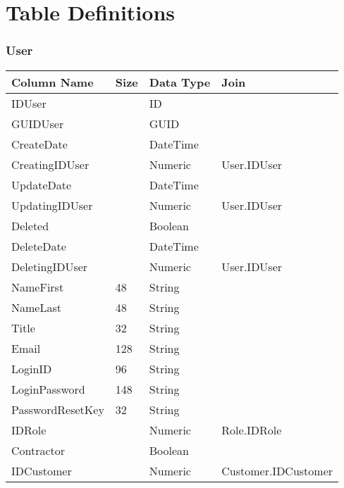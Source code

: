 \part{Table Definitions}

\section{User}
\begin{small}
\begin{tabular}{ p{5cm} p{1cm} p{3cm}  p{3.75cm} }
\textbf{Column Name} & \textbf{Size} & \textbf{Data Type} & \textbf{Join} \\ \hline 
IDUser &  & ID &  \\ 
GUIDUser &  & GUID &  \\ 
CreateDate &  & DateTime &  \\ 
CreatingIDUser &  & Numeric & User.IDUser \\ 
UpdateDate &  & DateTime &  \\ 
UpdatingIDUser &  & Numeric & User.IDUser \\ 
Deleted &  & Boolean &  \\ 
DeleteDate &  & DateTime &  \\ 
DeletingIDUser &  & Numeric & User.IDUser \\ 
NameFirst & 48 & String &  \\ 
NameLast & 48 & String &  \\ 
Title & 32 & String &  \\ 
Email & 128 & String &  \\ 
LoginID & 96 & String &  \\ 
LoginPassword & 148 & String &  \\ 
PasswordResetKey & 32 & String &  \\ 
IDRole &  & Numeric & Role.IDRole \\ 
Contractor &  & Boolean &  \\ 
IDCustomer &  & Numeric & Customer.IDCustomer \\ 
\end{tabular}
\end{small}

